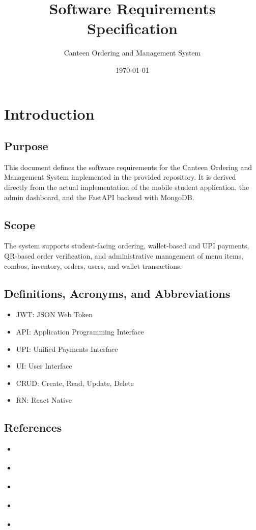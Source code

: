 \documentclass[11pt]{article}
\title{Software Requirements Specification}
\author{Canteen Ordering and Management System}
\date{\today}
\begin{document}
\maketitle
{}
\tableofcontents
\newpage
{}

\section{Introduction}
\subsection{Purpose}
This document defines the software requirements for the Canteen Ordering and Management System implemented in the provided repository. It is derived directly from the actual implementation of the mobile student application, the admin dashboard, and the FastAPI backend with MongoDB.

\subsection{Scope}
The system supports student-facing ordering, wallet-based and UPI payments, QR-based order verification, and administrative management of menu items, combos, inventory, orders, users, and wallet transactions.

\subsection{Definitions, Acronyms, and Abbreviations}
\begin{itemize}[nosep]
  \item JWT: JSON Web Token
  \item API: Application Programming Interface
  \item UPI: Unified Payments Interface
  \item UI: User Interface
  \item CRUD: Create, Read, Update, Delete
  \item RN: React Native
\end{itemize}

\subsection{References}
\begin{itemize}[nosep]
  \item \cite{fastapi}
  \item \cite{reactnative}
  \item \cite{mongodb}
  \item \cite{expo}
  \item \cite{typescript}
\end{itemize}
\end{document}

